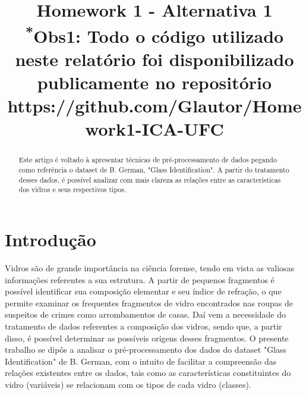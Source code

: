 \documentclass[conference]{IEEEtran}
\begin{document}
\title{Homework 1 - Alternativa 1\\
{\footnotesize \textsuperscript{*}Obs1: Todo o código utilizado neste relatório foi disponibilizado publicamente no repositório https://github.com/Glautor/Homework1-ICA-UFC}
}

\author{
\and
{}
\and
{}
}

\maketitle

\begin{abstract}
Este artigo é voltado à apresentar técnicas de pré-processamento 
de dados pegando como referência o dataset de B. German, "Glass Identification".
A partir do tratamento desses dados, é possível analizar com mais clareza as relações 
entre as características dos vidros e seus respectivos tipos.
\end{abstract}

\section{Introdução}
Vidros são de grande importância na ciência forense, tendo em vista as valiosas informações referentes a sua estrutura. 
A partir de pequenos fragmentos é possível identificar sua composição elementar e seu índice de refração, o que permite examinar
os frequentes fragmentos de vidro encontrados nas roupas de suspeitos de crimes como arrombamentos de casas.
Daí vem a necessidade do tratamento de dados referentes a composição dos vidros, sendo que, a partir disso, é possível determinar as 
possíveis origens desses fragmentos.
O presente trabalho se dipôs a analisar o pré-processamento dos dados do dataset "Glass Identification" de B. German, com o intuito de facilitar a compreensão das relações existentes
entre os dados, tais como as características constituintes do vidro (variáveis) se relacionam com os tipos de cada vidro (classes). 
\end{document}
